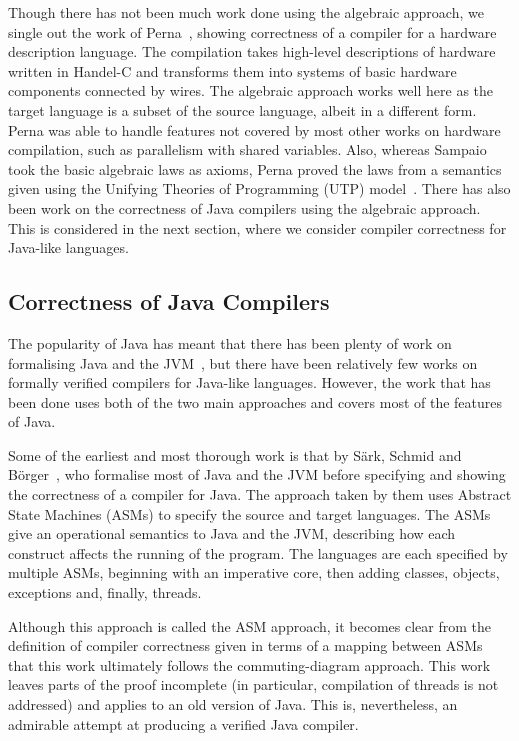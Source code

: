 Though there has not been much work done using the algebraic approach,
we single out the work of Perna~\cite{perna2010, perna2011}, showing
correctness of a compiler for a hardware description language.
The compilation takes high-level descriptions of hardware written in
Handel-C and transforms them into systems of basic hardware components
connected by wires.
The algebraic approach works well here as the target language is a
subset of the source language, albeit in a different form.
Perna was able to handle features not covered by most other works on
hardware compilation, such as parallelism with shared variables.
Also, whereas Sampaio took the basic algebraic laws as axioms, Perna
proved the laws from a semantics given using the Unifying Theories of
Programming (UTP) model~\cite{hoare1998}.
There has also been work on the correctness of Java compilers using
the algebraic approach.
This is considered in the next section, where we consider compiler
correctness for Java-like languages.

\subsection{Correctness of Java Compilers}
\label{java-compiler-correctness-subsection}

The popularity of Java has meant that there has been plenty of work on
formalising Java and the JVM~\cite{hartel2001}, but there have been
relatively few works on formally verified compilers for Java-like
languages.
However, the work that has been done uses both of the two main
approaches and covers most of the features of Java.

Some of the earliest and most thorough work is that by S\"{a}rk,
Schmid and B\"{o}rger~\cite{stark2001}, who formalise most of Java and
the JVM before specifying and showing the correctness of a compiler
for Java.
The approach taken by them uses Abstract State Machines (ASMs) to
specify the source and target languages.
The ASMs give an operational semantics to Java and the JVM, describing
how each construct affects the running of the program.
The languages are each specified by multiple ASMs, beginning with an
imperative core, then adding classes, objects, exceptions and,
finally, threads.

Although this approach is called the ASM approach, it becomes clear
from the definition of compiler correctness given in terms of a
mapping between ASMs that this work ultimately follows the
commuting-diagram approach.
This work leaves parts of the proof incomplete (in particular,
compilation of threads is not addressed) and applies to an old version
of Java.
This is, nevertheless, an admirable attempt at producing a verified
Java compiler.

